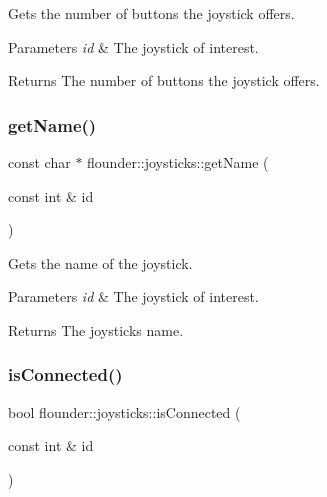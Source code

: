 Gets the number of buttons the joystick offers. 


\begin{DoxyParams}{Parameters}
{\em id} & The joystick of interest. \\
\hline
\end{DoxyParams}
\begin{DoxyReturn}{Returns}
The number of buttons the joystick offers. 
\end{DoxyReturn}
\mbox{\label{classflounder_1_1joysticks_ae471533fed9714160b5af9e22b00c427}} 
\subsubsection{\texorpdfstring{get\+Name()}{getName()}}
{\footnotesize\ttfamily const char $\ast$ flounder\+::joysticks\+::get\+Name (\begin{DoxyParamCaption}\item[{const int \&}]{id }\end{DoxyParamCaption})}



Gets the name of the joystick. 


\begin{DoxyParams}{Parameters}
{\em id} & The joystick of interest. \\
\hline
\end{DoxyParams}
\begin{DoxyReturn}{Returns}
The joysticks name. 
\end{DoxyReturn}
\mbox{\label{classflounder_1_1joysticks_a5474ad44039f8b1bdcd73a268d09e7f2}} 
\subsubsection{\texorpdfstring{is\+Connected()}{isConnected()}}
{\footnotesize\ttfamily bool flounder\+::joysticks\+::is\+Connected (\begin{DoxyParamCaption}\item[{const int \&}]{id }\end{DoxyParamCaption})}



